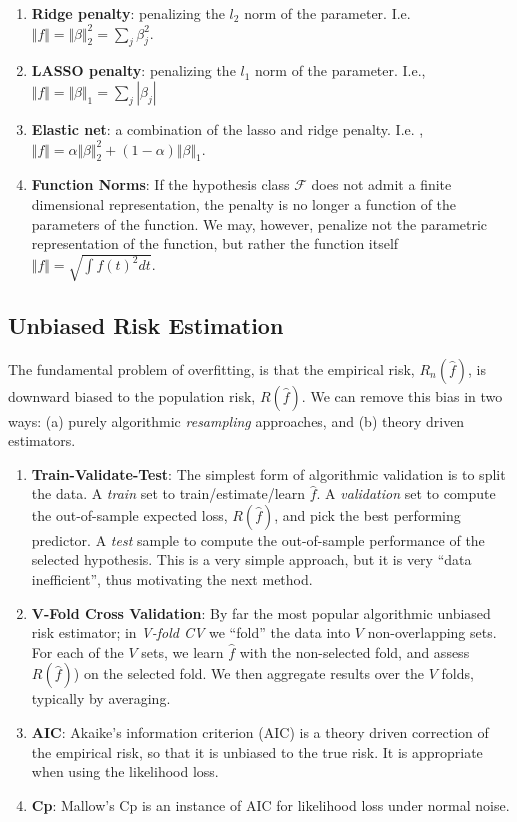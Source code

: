 \documentclass[]{book}
\providecommand{\tightlist}{%
  \setlength{\itemsep}{0pt}\setlength{\parskip}{0pt}}
\theoremstyle{definition}
\theoremstyle{definition}
\theoremstyle{definition}
\theoremstyle{remark}
\begin{document}
\begin{enumerate}
\def\labelenumi{\arabic{enumi}.}
\tightlist
\item
  \textbf{Ridge penalty}: penalizing the \(l_2\) norm of the parameter.
  I.e. \(\Vert f \Vert=\Vert \beta \Vert_2^2=\sum_j \beta_j^2\).
\item
  \textbf{LASSO penalty}: penalizing the \(l_1\) norm of the parameter.
  I.e., \(\Vert f \Vert=\Vert \beta \Vert_1=\sum_j |\beta_j|\)
\item
  \textbf{Elastic net}: a combination of the lasso and ridge penalty.
  I.e.
  ,\(\Vert f \Vert= \alpha \Vert \beta \Vert_2^2 + (1-\alpha) \Vert \beta \Vert_1\).
\item
  \textbf{Function Norms}: If the hypothesis class \(\mathcal{F}\) does
  not admit a finite dimensional representation, the penalty is no
  longer a function of the parameters of the function. We may, however,
  penalize not the parametric representation of the function, but rather
  the function itself \(\Vert f \Vert=\sqrt{\int f(t)^2 dt}\).
\end{enumerate}

\subsection{Unbiased Risk Estimation}\label{unbiased-risk-estimation}

The fundamental problem of overfitting, is that the empirical risk,
\(R_n(\hat f)\), is downward biased to the population risk,
\(R(\hat f)\). We can remove this bias in two ways: (a) purely
algorithmic \emph{resampling} approaches, and (b) theory driven
estimators.

\begin{enumerate}
\def\labelenumi{\arabic{enumi}.}
\item
  \textbf{Train-Validate-Test}: The simplest form of algorithmic
  validation is to split the data. A \emph{train} set to
  train/estimate/learn \(\hat f\). A \emph{validation} set to compute
  the out-of-sample expected loss, \(R(\hat f)\), and pick the best
  performing predictor. A \emph{test} sample to compute the
  out-of-sample performance of the selected hypothesis. This is a very
  simple approach, but it is very ``data inefficient'', thus motivating
  the next method.
\item
  \textbf{V-Fold Cross Validation}: By far the most popular algorithmic
  unbiased risk estimator; in \emph{V-fold CV} we ``fold'' the data into
  \(V\) non-overlapping sets. For each of the \(V\) sets, we learn
  \(\hat f\) with the non-selected fold, and assess \(R(\hat f)\)) on
  the selected fold. We then aggregate results over the \(V\) folds,
  typically by averaging.
\item
  \textbf{AIC}: Akaike's information criterion (AIC) is a theory driven
  correction of the empirical risk, so that it is unbiased to the true
  risk. It is appropriate when using the likelihood loss.
\item
  \textbf{Cp}: Mallow's Cp is an instance of AIC for likelihood loss
  under normal noise.
\end{enumerate}
\end{document}
